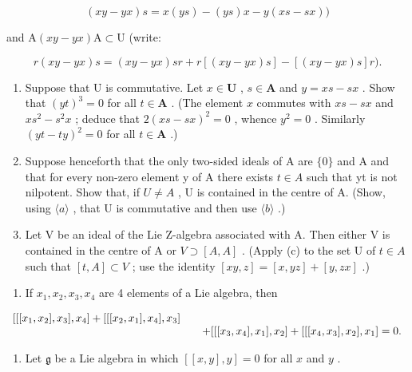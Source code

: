 \[
(x y - y x) s = x (y s) - (y s) x - y (x s - s x))
\]

and \(\mathrm{A}(xy - yx)\mathrm{A} \subset \mathrm{U}\) (write:

\[
r (x y - y x) s = (x y - y x) s r + r [ (x y - y x) s ] - [ (x y - y x) s ] r).
\]

\begin{enumerate}
\def\labelenumi{(\alph{enumi})}
\setcounter{enumi}{1}
\item
  Suppose that U is commutative. Let \(x \in \mathbf{U}\) , \(s \in \mathbf{A}\) and \(y = xs - sx\) . Show that \((yt)^3 = 0\) for all \(t \in \mathbf{A}\) . (The element \(x\) commutes with \(xs - sx\) and \(xs^2 - s^2x\) ; deduce that \(2(xs - sx)^2 = 0\) , whence \(y^2 = 0\) . Similarly \((yt - ty)^2 = 0\) for all \(t \in \mathbf{A}\) .)
\item
  Suppose henceforth that the only two-sided ideals of A are \(\{0\}\) and A and that for every non-zero element y of A there exists \(t \in A\) such that yt is not nilpotent. Show that, if \(U \neq A\) , U is contained in the centre of A. (Show, using \(\langle a\rangle\) , that U is commutative and then use \(\langle b\rangle\) .)
\item
  Let V be an ideal of the Lie Z-algebra associated with A. Then either V is contained in the centre of A or \(V \supset [A, A]\) . (Apply (c) to the set U of \(t \in A\) such that \([t, A] \subset V\) ; use the identity \([xy, z] = [x, yz] + [y, zx]\) .)
\end{enumerate}

\begin{enumerate}
\def\labelenumi{\arabic{enumi}.}
\setcounter{enumi}{7}
\tightlist
\item
  If \(x_{1}, x_{2}, x_{3}, x_{4}\) are 4 elements of a Lie algebra, then
\end{enumerate}

\[
\begin{array}{r l} {[ [ [ x _ {1}, x _ {2} ], x _ {3} ], x _ {4} ] + [ [ [ x _ {2}, x _ {1} ], x _ {4} ], x _ {3} ]} & \\ & \quad + [ [ [ x _ {3}, x _ {4} ], x _ {1} ], x _ {2} ] + [ [ [ x _ {4}, x _ {3} ], x _ {2} ], x _ {1} ] = 0. \end{array}
\]

\begin{enumerate}
\def\labelenumi{\arabic{enumi}.}
\setcounter{enumi}{8}
\tightlist
\item
  Let \(\mathfrak{g}\) be a Lie algebra in which \([[x,y],y] = 0\) for all \(x\) and \(y\) .
\end{enumerate}

